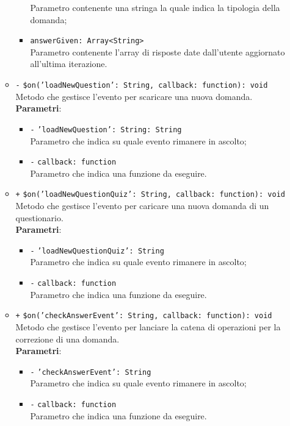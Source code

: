 \begin{itemize}
\begin{itemize}
\begin{itemize}
			Parametro contenente una stringa la quale indica la tipologia della domanda;
			\item \texttt{answerGiven: Array<String>} \\
			Parametro contenente l'array di risposte date dall'utente aggiornato all'ultima iterazione.
		\end{itemize}
		\item \texttt{-} \texttt{\$on('loadNewQuestion': String, callback: function): void} \\
		Metodo che gestisce l'evento per scaricare una nuova domanda. \\
		\textbf{Parametri}:
		\begin{itemize}
			\item \texttt{-} \texttt{'loadNewQuestion': String: String} \\
			Parametro che indica su quale evento rimanere in ascolto;
			\item \texttt{-} \texttt{callback: function} \\
			Parametro che indica una funzione da eseguire.
		\end{itemize}
		\item \texttt{+} \texttt{\$on('loadNewQuestionQuiz': String, callback: function): void} \\
		Metodo che gestisce l'evento per caricare una nuova domanda di un questionario.\\
		\textbf{Parametri}:
		\begin{itemize}
			\item \texttt{-} \texttt{'loadNewQuestionQuiz': String} \\
			Parametro che indica su quale evento rimanere in ascolto;
			\item \texttt{-} \texttt{callback: function} \\
			Parametro che indica una funzione da eseguire.
		\end{itemize}
		\item \texttt{+} \texttt{\$on('checkAnswerEvent': String, callback: function): void} \\
		Metodo che gestisce l'evento per lanciare la catena di operazioni per la correzione di una domanda. \\
		\textbf{Parametri}:
		\begin{itemize}
			\item \texttt{-} \texttt{'checkAnswerEvent': String} \\
			Parametro che indica su quale evento rimanere in ascolto;
			\item \texttt{-} \texttt{callback: function} \\
			Parametro che indica una funzione da eseguire.
		\end{itemize}
	\end{itemize}
\end{itemize}

